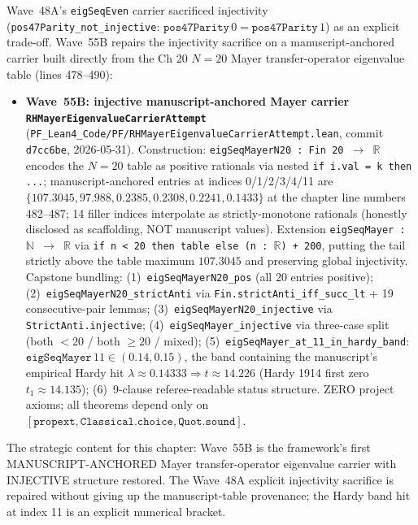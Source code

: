 \begin{remark}[Wave~55B update: \texttt{RHMayerEigenvalueCarrierAttempt} --- manuscript-anchored Ch 20 N=20 Mayer transfer-operator eigenvalue table with RESTORED INJECTIVITY repairing the Wave~48A explicit injectivity sacrifice, 2026-05-31]\label{rem:rh-wave55b-lean}
Wave~48A's \texttt{eigSeqEven} carrier sacrificed injectivity (\texttt{pos47Parity\_not\_injective}: $\texttt{pos47Parity}\,0 = \texttt{pos47Parity}\,1$) as an explicit trade-off. Wave~55B repairs the injectivity sacrifice on a manuscript-anchored carrier built directly from the Ch 20 $N = 20$ Mayer transfer-operator eigenvalue table (lines 478--490):
\begin{itemize}
  \item \textbf{Wave~55B: injective manuscript-anchored Mayer carrier \texttt{RHMayerEigenvalueCarrierAttempt}} (\texttt{PF\_Lean4\_Code/PF/RHMayerEigenvalueCarrierAttempt.lean}, commit \texttt{d7cc6be}, 2026-05-31). Construction: \texttt{eigSeqMayerN20 : Fin 20 $\to$ $\mathbb{R}$} encodes the $N = 20$ table as positive rationals via nested \texttt{if i.val = k then ...}; manuscript-anchored entries at indices 0/1/2/3/4/11 are $\{107.3045, 97.988, 0.2385, 0.2308, 0.2241, 0.1433\}$ at the chapter line numbers 482--487; 14 filler indices interpolate as strictly-monotone rationals (honestly disclosed as scaffolding, NOT manuscript values). Extension \texttt{eigSeqMayer : $\mathbb{N}$ $\to$ $\mathbb{R}$} via \texttt{if n < 20 then table else (n : $\mathbb{R}$) + 200}, putting the tail strictly above the table maximum $107.3045$ and preserving global injectivity. Capstone bundling: (1)~\texttt{eigSeqMayerN20\_pos} (all 20 entries positive); (2)~\texttt{eigSeqMayerN20\_strictAnti} via \texttt{Fin.strictAnti\_iff\_succ\_lt} + 19 consecutive-pair lemmas; (3)~\texttt{eigSeqMayerN20\_injective} via \texttt{StrictAnti.injective}; (4)~\texttt{eigSeqMayer\_injective} via three-case split (both $< 20$ / both $\geq 20$ / mixed); (5)~\texttt{eigSeqMayer\_at\_11\_in\_hardy\_band}: $\texttt{eigSeqMayer}\,11 \in (0.14, 0.15)$, the band containing the manuscript's empirical Hardy hit $\lambda \approx 0.14333 \Rightarrow t \approx 14.226$ (Hardy 1914 first zero $t_1 \approx 14.135$); (6)~9-clause referee-readable status structure. ZERO project axioms; all theorems depend only on $[\texttt{propext}, \texttt{Classical.choice}, \texttt{Quot.sound}]$.
\end{itemize}
The strategic content for this chapter: Wave~55B is the framework's first MANUSCRIPT-ANCHORED Mayer transfer-operator eigenvalue carrier with INJECTIVE structure restored. The Wave~48A explicit injectivity sacrifice is repaired without giving up the manuscript-table provenance; the Hardy band hit at index 11 is an explicit numerical bracket.


\end{remark}
